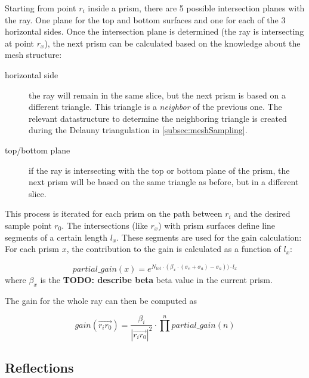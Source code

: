 Starting from point $r_i$ inside a prism, there are 5 possible intersection
planes with the ray. One plane for the top and bottom surfaces and one for each
of the 3 horizontal sides. Once the intersection plane is determined (the ray is
intersecting at point $r_x$), the next prism can be calculated based on the
knowledge about the mesh structure:

\begin{description}

  \item[horizontal side]
    the ray will remain in the same slice, but the next prism is based on a
    different triangle. This triangle is a \emph{neighbor} of the previous one.
    The relevant datastructure to determine the neighboring triangle is created
    during the Delauny triangulation in \ref{subsec:meshSampling}.

  \item[top/bottom plane]
    if the ray is intersecting with the top or bottom plane of the prism, the
    next prism will be based on the same triangle as before, but in a different
    slice.

\end{description}

This process is iterated for each prism on the path between $r_i$ and the
desired sample point $r_0$. The intersections (like $r_x$) with prism surfaces
define line segments of a certain length $l_x$. These segments are used for the
gain calculation: For each prism $x$, the contribution to the gain is calculated
as a function of $l_x$:

\begin{equation}
\label{eq:partial_gain}
  partial\_gain(x) = 
  e^{N_{tot} \cdot (\beta_x \cdot (\sigma_e + \sigma_a) - \sigma_a)) \cdot l_x}
\end{equation}
where $\beta_x$ is the \textbf{TODO: describe beta} beta value in the current
prism.

The gain for the whole ray can then be computed as

\begin{equation}
\label{eq:gain}
  gain(\overrightarrow{r_ir_0}) =  
  \frac{\beta_i}{ |\overrightarrow{r_ir_0}|^2} \cdot \prod^npartial\_gain(n) 
\end{equation}


\subsection{Reflections}
\label{subsec:reflections}

